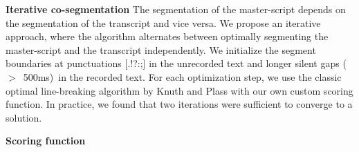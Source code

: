 \textbf{Iterative co-segmentation}
The segmentation of the master-script depends on the segmentation of the transcript and vice versa. We propose an iterative approach, where the algorithm alternates between optimally segmenting the master-script and the transcript independently. We initialize the segment boundaries at punctuations [.!?:;] in the unrecorded text and longer silent gaps ($>$\ 500ms)\ in the recorded text. For each optimization step, we use the classic optimal line-breaking algorithm by Knuth and Plass \cite{} with our own custom scoring function. In practice, we found that two iterations were sufficient to converge to a solution. 

\textbf{Scoring function}







